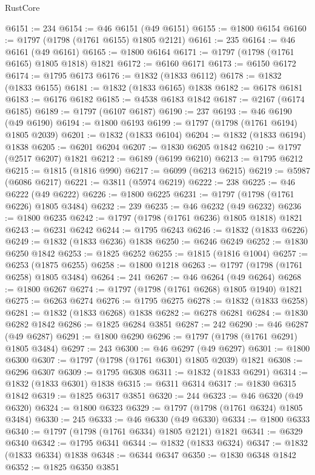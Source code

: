 \begin{lexlean}{RustCore}
\begin{coremodule}
@6151 := 234
@6154 := @46 @6151 (@49 @6151)
@6155 := @1800 @6154
@6160 := @1797 (@1798 (@1761 @6155) @1805 @2121)
@6161 := 235
@6164 := @46 @6161 (@49 @6161)
@6165 := @1800 @6164
@6171 := @1797 (@1798 (@1761 @6165) @1805 @1818) @1821
@6172 := @6160 @6171
@6173 := @6150 @6172
@6174 := @1795 @6173
@6176 := @1832 (@1833 @6112)
@6178 := @1832 (@1833 @6155)
@6181 := @1832 (@1833 @6165) @1838
@6182 := @6178 @6181
@6183 := @6176 @6182
@6185 := @4538 @6183 @1842
@6187 := @2167 (@6174 @6185)
@6189 := @1797 (@6107 @6187)
@6190 := 237
@6193 := @46 @6190 (@49 @6190)
@6194 := @1800 @6193
@6199 := @1797 (@1798 (@1761 @6194) @1805 @2039)
@6201 := @1832 (@1833 @6104)
@6204 := @1832 (@1833 @6194) @1838
@6205 := @6201 @6204
@6207 := @1830 @6205 @1842
@6210 := @1797 (@2517 @6207) @1821
@6212 := @6189 (@6199 @6210)
@6213 := @1795 @6212
@6215 := @1815 (@1816 @990)
@6217 := @6099 (@6213 @6215)
@6219 := @5987 (@6086 @6217)
@6221 := @3811 (@5974 @6219)
@6222 := 238
@6225 := @46 @6222 (@49 @6222)
@6226 := @1800 @6225
@6231 := @1797 (@1798 (@1761 @6226) @1805 @3484)
@6232 := 239
@6235 := @46 @6232 (@49 @6232)
@6236 := @1800 @6235
@6242 := @1797 (@1798 (@1761 @6236) @1805 @1818) @1821
@6243 := @6231 @6242
@6244 := @1795 @6243
@6246 := @1832 (@1833 @6226)
@6249 := @1832 (@1833 @6236) @1838
@6250 := @6246 @6249
@6252 := @1830 @6250 @1842
@6253 := @1825 @6252
@6255 := @1815 (@1816 @1004)
@6257 := @6253 (@1875 @6255)
@6258 := @1800 @1218
@6263 := @1797 (@1798 (@1761 @6258) @1805 @3484)
@6264 := 241
@6267 := @46 @6264 (@49 @6264)
@6268 := @1800 @6267
@6274 := @1797 (@1798 (@1761 @6268) @1805 @1940) @1821
@6275 := @6263 @6274
@6276 := @1795 @6275
@6278 := @1832 (@1833 @6258)
@6281 := @1832 (@1833 @6268) @1838
@6282 := @6278 @6281
@6284 := @1830 @6282 @1842
@6286 := @1825 @6284 @3851
@6287 := 242
@6290 := @46 @6287 (@49 @6287)
@6291 := @1800 @6290
@6296 := @1797 (@1798 (@1761 @6291) @1805 @3484)
@6297 := 243
@6300 := @46 @6297 (@49 @6297)
@6301 := @1800 @6300
@6307 := @1797 (@1798 (@1761 @6301) @1805 @2039) @1821
@6308 := @6296 @6307
@6309 := @1795 @6308
@6311 := @1832 (@1833 @6291)
@6314 := @1832 (@1833 @6301) @1838
@6315 := @6311 @6314
@6317 := @1830 @6315 @1842
@6319 := @1825 @6317 @3851
@6320 := 244
@6323 := @46 @6320 (@49 @6320)
@6324 := @1800 @6323
@6329 := @1797 (@1798 (@1761 @6324) @1805 @3484)
@6330 := 245
@6333 := @46 @6330 (@49 @6330)
@6334 := @1800 @6333
@6340 := @1797 (@1798 (@1761 @6334) @1805 @2121) @1821
@6341 := @6329 @6340
@6342 := @1795 @6341
@6344 := @1832 (@1833 @6324)
@6347 := @1832 (@1833 @6334) @1838
@6348 := @6344 @6347
@6350 := @1830 @6348 @1842
@6352 := @1825 @6350 @3851

\end{coremodule}
\end{lexlean}
